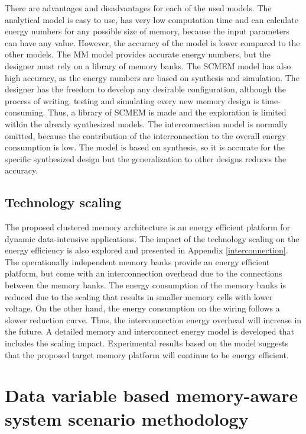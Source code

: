 There are advantages and disadvantages for each of the used models.
The analytical model is easy to use, has very low computation time and can calculate energy numbers for any possible size of memory, because the input parameters can have any value.
However, the accuracy of the model is lower compared to the other models.
The MM model provides accurate energy numbers, but the designer must rely on a library of memory banks.
The SCMEM model has also high accuracy, as the energy numbers are based on synthesis and simulation.
The designer has the freedom to develop any desirable configuration, although the process of writing, testing and simulating every new memory design is time-consuming.
Thus, a library of SCMEM is made and the exploration is limited within the already synthesized models.
The interconnection model is normally omitted, because the contribution of the interconnection to the overall energy consumption is low.
The model is based on synthesis, so it is accurate for the specific synthesized design but the generalization to other designs reduces the accuracy. 

\subsection{Technology scaling}

The proposed clustered memory architecture is an energy efficient platform for dynamic data-intensive applications.
The impact of the technology scaling on the energy efficiency is also explored and presented in Appendix \ref{interconnection}. 
The operationally independent memory banks provide an energy efficient platform, but come with an interconnection overhead due to the connections between the memory banks. 
The energy consumption of the memory banks is reduced due to the scaling that results in smaller memory cells with lower voltage.
On the other hand, the energy consumption on the wiring follows a slower reduction curve.
Thus, the interconnection energy overhead will increase in the future.
A detailed memory and interconnect energy model is developed that includes the scaling impact.
Experimental results based on the model suggests that the proposed target memory platform will continue to be energy efficient.

\section{Data variable based memory-aware system scenario methodology}

